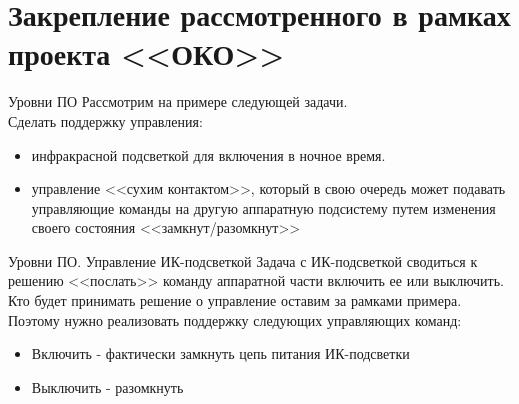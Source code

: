 \section{Закрепление рассмотренного в рамках проекта <<ОКО>>}
\begin{frame}[fragile]{Уровни ПО}
Рассмотрим на примере следующей задачи. \\
Сделать поддержку управления: 
\begin{itemize}
\item инфракрасной подсветкой для включения в ночное время.
\item управление <<сухим контактом>>, который в свою очередь может подавать управляющие команды на другую аппаратную подсистему путем изменения своего состояния <<замкнут/разомкнут>> 
\end{itemize}
\end{frame}



\begin{frame}[fragile]{Уровни ПО. Управление ИК-подсветкой}
Задача с ИК-подсветкой сводиться к решению <<послать>> команду аппаратной части включить ее или выключить. \\
Кто будет принимать решение о управление оставим за рамками примера. Поэтому нужно реализовать поддержку следующих управляющих команд:
\begin{itemize}
\item Включить - фактически замкнуть цепь питания ИК-подсветки
\item Выключить - разомкнуть 
\end{itemize}

\end{frame}

